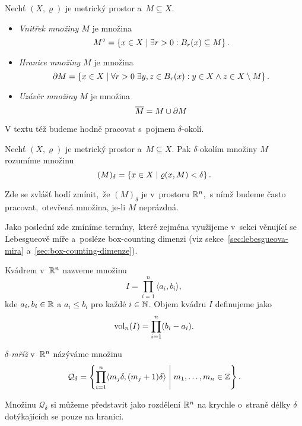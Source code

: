 \begin{definition}\label{def:vnitrek-hranice-uzaver}
    Nechť $(X,\varrho)$ je metrický prostor a~$M\subseteq X$.
    \begin{itemize}
        \item \emph{Vnitřek množiny $M$} je množina
        \[M^\circ=\left\{x\in X\mid \exists r>0: B_r(x)\subseteq M\right\}.\]
        \item \emph{Hranice množiny $M$} je množina
        \[\partial M=\left\{x\in X\mid \forall r>0\;\exists y,z\in B_r(x): y\in X\land z\in X\setminus M\right\}.\]
        \item \emph{Uzávěr množiny $M$} je množina
        \[\overline{M}=M\cup\partial M\]
    \end{itemize}
\end{definition}
V textu též budeme hodně pracovat s~pojmem $\delta$-okolí.
\begin{definition}\label{def:delta-okoli}
    Nechť $(X,\varrho)$ je metrický prostor a~$M\subseteq X$. Pak $\delta$-okolím množiny $M$ rozumíme množinu
    \[(M)_\delta=\left\{x\in X\mid\varrho(x,M)<\delta\right\}.\]
\end{definition}
Zde se zvlášť hodí zmínit,~že $(M)_\delta$ je v~prostoru $\mathbb{R}^n$,~s nímž budeme často pracovat,~otevřená množina, je-li $M$ neprázdná.

Jako poslední zde zmíníme termíny,~které zejména využijeme v~sekci věnující se Lebesgueově míře a~posléze box-counting dimenzi (viz sekce~\ref{sec:lebesgueova-mira} a~\ref{sec:box-counting-dimenze}).
\begin{definition}[Kvádr]\label{def:kvadr}
    Kvádrem v~$\mathbb{R}^n$ nazveme množinu
    \[I=\prod_{i=1}^{n}\langle a_i,b_i\rangle,\]
    kde $a_i,b_i\in\mathbb{R}$ a $a_i\leqslant b_i$ pro každé $i\in\mathbb{N}$. Objem kvádru $I$ definujeme jako
    \[\operatorname{vol}_n(I)=\prod_{i=1}^{n}(b_i-a_i).\]
\end{definition}
\begin{definition}\label{def:delta-mriz}
    \emph{$\delta$-mříž} v~$\mathbb{R}^n$ názýváme množinu
    \[\mathcal{Q}_\delta=\left\{\prod_{i=1}^{n}\langle m_j\delta,(m_j+1)\delta\rangle\;\middle|\;m_1,\ldots,m_n\in\mathbb{Z}\right\}.\]
\end{definition}
Množinu $\mathcal{Q}_\delta$ si můžeme představit jako rozdělení $\mathbb{R}^n$ na krychle o~straně délky $\delta$ dotýkajících se pouze na hranici.


